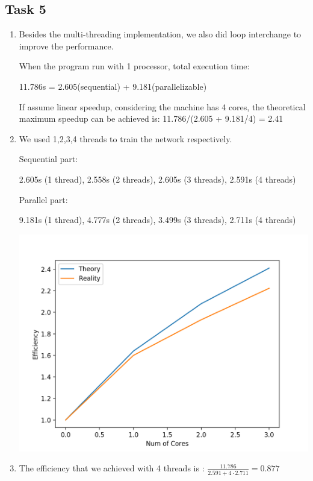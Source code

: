 \documentclass[a4paper, DIV12, headsepline]{scrartcl}
\begin{document}
\subsection*{Task 5}
\begin{enumerate}[label=\alph*)]
\item Besides the multi-threading implementation, we also did loop interchange to improve the performance. 

When the program run with 1 processor, total execution time: 

11.786s = 2.605(sequential) + 9.181(parallelizable)

If assume linear speedup, considering the machine has 4 cores, the theoretical  maximum speedup can be achieved is: 11.786/(2.605 + 9.181/4) = 2.41

\item We used 1,2,3,4 threads to train the network respectively. 

Sequential part: 

	    2.605s (1 thread), 2.558s (2 threads), 2.605s (3 threads), 2.591s (4 threads)

Parallel part: 

	    9.181s (1 thread), 4.777s (2 threads), 3.499s (3 threads), 2.711s (4 threads)

\begin{center}
	\includegraphics[scale=0.5]{task-5-plot}
\end{center}

%

\item The efficiency that we achieved with 4 threads is : $\frac{11.786}{2.591 + 4 \cdot 2.711} = 0.877$
%
%
%
\end{enumerate}
\end{document}
